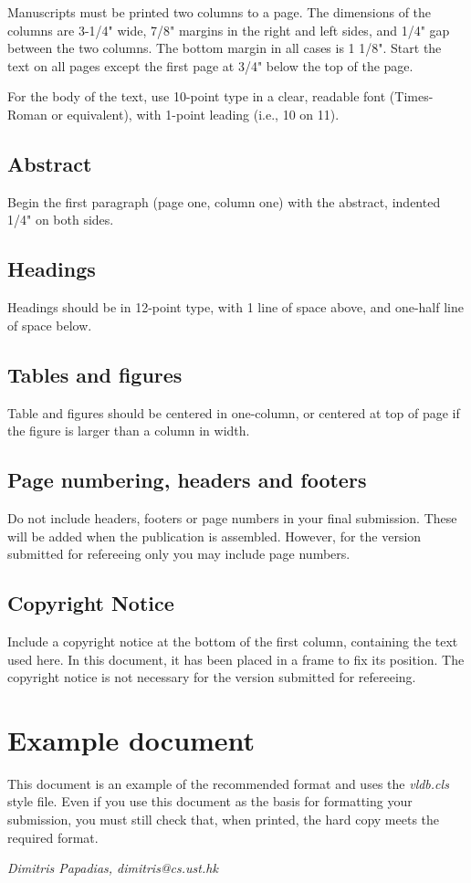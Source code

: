 \documentclass{cidr}
\begin{document}
Manuscripts must be printed two columns to a page.  The dimensions of
the columns are 3-1/4" wide, 7/8" margins in the right and left sides,
and 1/4" gap between the two columns.  The bottom margin in all cases is
1 1/8". Start the text on all pages except the first page at 3/4" below
the top of the page.

For the body of the text, use 10-point type in a clear, readable font
(Times-Roman or equivalent), with 1-point leading (i.e., 10 on 11).

\subsection{Abstract}

Begin the first paragraph (page one, column one) with the abstract,
indented 1/4" on both sides.

\subsection{Headings}

Headings should be in 12-point type, with 1 line of space above, and
one-half line of space below.

\subsection{Tables and figures}

Table and figures should be centered in one-column, or centered at top
of page if the figure is larger than a column in width.


\subsection{Page numbering, headers and footers}

Do not include headers, footers or page numbers in your final
submission. These will be added when the publication is assembled.
However, for the version submitted for refereeing only you may include
page numbers.

\subsection{Copyright Notice}

Include a copyright notice at the bottom of the first column, containing
the text used here. In this document, it has been placed in a frame to
fix its position. The copyright notice is not necessary for the version
submitted for refereeing.

\section{Example document}

This document is an example of the recommended format and uses the {\em
vldb.cls} style file.  Even if you use this document as the basis for
formatting your submission, you must still check that, when printed, the
hard copy meets the required format.


\bigskip

{\em Dimitris Papadias, dimitris@cs.ust.hk}
\end{document}
